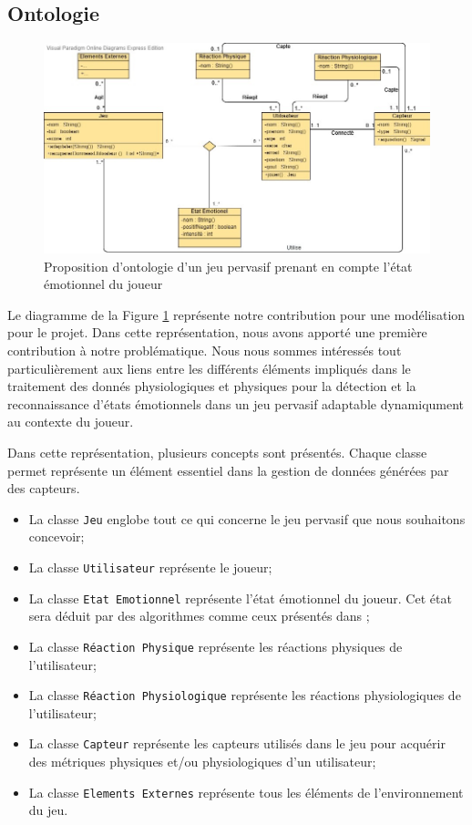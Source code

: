 \documentclass[11pt]{article}
\begin{document}
	\subsection{Ontologie}\label{sec:ontologie}
		\begin{figure}[t]
			\centering
			\includegraphics[scale=0.5]{../include/ontologie_stage_cnam-v2-7.jpg}
			\caption{Proposition d'ontologie d'un jeu pervasif prenant en compte l'état émotionnel du joueur}
			\label{fig:modele}
		\end{figure}
		Le diagramme de la Figure \ref{fig:modele} représente notre contribution pour une modélisation pour le projet.
		Dans cette représentation, nous avons apporté une première contribution à notre problématique.
		Nous nous sommes intéressés tout particulièrement aux liens entre les différents éléments impliqués dans le traitement des donnés physiologiques et physiques pour la détection et la reconnaissance d'états émotionnels dans un jeu pervasif adaptable dynamiqument au contexte du joueur.\par
		Dans cette représentation, plusieurs concepts sont présentés.
		Chaque classe permet représente un élément essentiel dans la gestion de données générées par des capteurs.
		\begin{itemize}
			\item La classe \texttt{Jeu} englobe tout ce qui concerne le jeu pervasif que nous souhaitons concevoir;
			\item La classe \texttt{Utilisateur} représente le joueur;
			\item La classe \texttt{Etat Emotionnel} représente l'état émotionnel du joueur. Cet état sera déduit par des algorithmes comme ceux présentés dans \cite{gal_2019, gal_et_al._2020};
			\item La classe \texttt{Réaction Physique} représente les réactions physiques de l'utilisateur;
			\item La classe \texttt{Réaction Physiologique} représente les réactions physiologiques de l'utilisateur;
			\item La classe \texttt{Capteur} représente les capteurs utilisés dans le jeu pour acquérir des métriques physiques et/ou physiologiques d'un utilisateur;
			\item La classe \texttt{Elements Externes} représente tous les éléments de l'environnement du jeu.
		\end{itemize}\par
\end{document}
